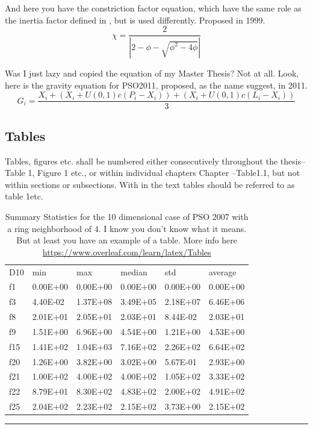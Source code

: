 \documentclass[../Thesis]{subfiles}
\begin{document}
And here you have the constriction factor equation, which have the same role as the inertia factor defined in , but is used differently. Proposed in 1999. 
\begin{equation} 
    \chi = \dfrac{2}{|2 - \phi - \sqrt{\phi^{2} - 4\phi}|} 
    \label{eqn:velocityConstriction} 
\end{equation} 

Was I just lazy and copied the equation of my Master Thesis? Not at all. Look, here is the gravity equation for PSO2011, proposed, as the name suggest, in 2011.
\begin{equation} 
    G_{i} = \dfrac{X_{i} + (X_{i}+U(0,1)c(P_{i}-X_{i})) + (X_{i}+U(0,1)c(L_{i}-X_{i}))}{3}
    \label{eqn:gravityVelocity2011} 
\end{equation} 

\clearpage  %

\subsection{Tables}
Tables, figures etc. shall be numbered either consecutively throughout the thesis–Table 1, Figure 1 etc., or within individual chapters Chapter –Table1.1, but not within sections or subsections. With in the text tables should be referred to as table 1etc.

\begin{table}[H]
    \centering
        \begin{tabular}{llllll}
        D10 & min      & max      & median   & std      & average  \\
        f1  & 0.00E+00 & 0.00E+00 & 0.00E+00 & 0.00E+00 & 0.00E+00 \\
        f3  & 4.40E-02 & 1.37E+08 & 3.49E+05 & 2.18E+07 & 6.46E+06 \\
        f8  & 2.01E+01 & 2.05E+01 & 2.03E+01 & 8.44E-02 & 2.03E+01 \\
        f9  & 1.51E+00 & 6.96E+00 & 4.54E+00 & 1.21E+00 & 4.53E+00 \\
        f15 & 1.41E+02 & 1.04E+03 & 7.16E+02 & 2.26E+02 & 6.64E+02 \\
        f20 & 1.26E+00 & 3.82E+00 & 3.02E+00 & 5.67E-01 & 2.93E+00 \\
        f21 & 1.00E+02 & 4.00E+02 & 4.00E+02 & 1.05E+02 & 3.33E+02 \\
        f22 & 8.79E+01 & 8.30E+02 & 4.83E+02 & 2.00E+02 & 4.91E+02 \\
        f25 & 2.04E+02 & 2.23E+02 & 2.15E+02 & 3.73E+00 & 2.15E+02
        \end{tabular}
    \rule{35em}{0.5pt} 
    \caption[Example table]{Summary Statistics for the 10 dimensional case of PSO 2007 with a ring neighborhood of 4. I know you don't know what it means. But at least you have an example of a table. More info here \url{https://www.overleaf.com/learn/latex/Tables}}
    \label{tab:PSO_2007_D10_R4}
\end{table}
\end{document}
